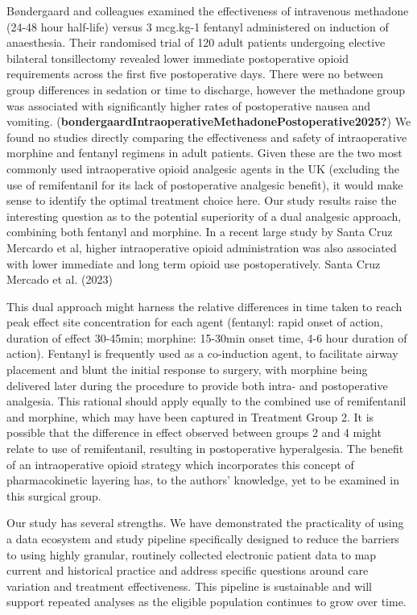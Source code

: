\documentclass[
  letterpaper,
  DIV=11,
  numbers=noendperiod]{scrreprt}
\begin{document}
Bøndergaard and colleagues examined the effectiveness of intravenous
methadone (24-48 hour half-life) versus 3 mcg.kg-1 fentanyl administered
on induction of anaesthesia. Their randomised trial of 120 adult
patients undergoing elective bilateral tonsillectomy revealed lower
immediate postoperative opioid requirements across the first five
postoperative days. There were no between group differences in sedation
or time to discharge, however the methadone group was associated with
significantly higher rates of postoperative nausea and vomiting.
(\textbf{bondergaardIntraoperativeMethadonePostoperative2025?}) We found
no studies directly comparing the effectiveness and safety of
intraoperative morphine and fentanyl regimens in adult patients. Given
these are the two most commonly used intraoperative opioid analgesic
agents in the UK (excluding the use of remifentanil for its lack of
postoperative analgesic benefit), it would make sense to identify the
optimal treatment choice here. Our study results raise the interesting
question as to the potential superiority of a dual analgesic approach,
combining both fentanyl and morphine. In a recent large study by Santa
Cruz Mercardo et al, higher intraoperative opioid administration was
also associated with lower immediate and long term opioid use
postoperatively. Santa Cruz Mercado et al. (2023)

This dual approach might harness the relative differences in time taken
to reach peak effect site concentration for each agent (fentanyl: rapid
onset of action, duration of effect 30-45min; morphine: 15-30min onset
time, 4-6 hour duration of action). Fentanyl is frequently used as a
co-induction agent, to facilitate airway placement and blunt the initial
response to surgery, with morphine being delivered later during the
procedure to provide both intra- and postoperative analgesia. This
rational should apply equally to the combined use of remifentanil and
morphine, which may have been captured in Treatment Group 2. It is
possible that the difference in effect observed between groups 2 and 4
might relate to use of remifentanil, resulting in postoperative
hyperalgesia. The benefit of an intraoperative opioid strategy which
incorporates this concept of pharmacokinetic layering has, to the
authors' knowledge, yet to be examined in this surgical group.

Our study has several strengths. We have demonstrated the practicality
of using a data ecosystem and study pipeline specifically designed to
reduce the barriers to using highly granular, routinely collected
electronic patient data to map current and historical practice and
address specific questions around care variation and treatment
effectiveness. This pipeline is sustainable and will support repeated
analyses as the eligible population continues to grow over time.
\end{document}
